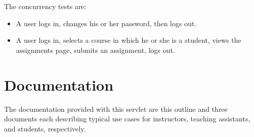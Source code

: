 \documentclass[a4paper]{article}
\begin{document}
The concurrency tests are:

\begin{itemize}
\item{A user logs in, changes his or her password, then logs out.}
\item{A user logs in, selects a course in which he or she is a student, views
  the assignments page, submits an assignment, logs out.}
\end{itemize}


\section{Documentation}\label{sec:docs}

The documentation provided with this servlet are this outline and three
documents each describing typical use cases for instructors, teaching
assistants, and students, respectively.
\end{document}
